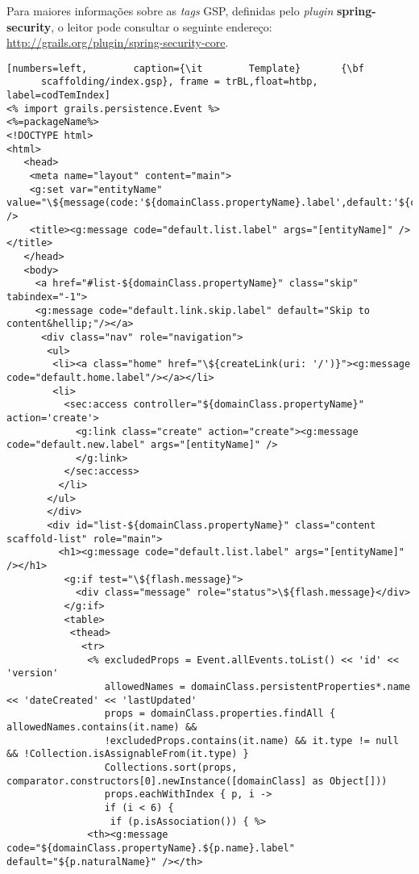 \vspace{0.3cm}

Para maiores  informações sobre as {\it  tags} GSP, definidas  pelo {\it plugin}
{\bf   spring-security},  o   leitor   pode  consultar   o  seguinte   endereço:
\url{http://grails.org/plugin/spring-security-core}. 

\begin{lstlisting}[numbers=left,        caption={\it        Template}       {\bf
      scaffolding/index.gsp}, frame = trBL,float=htbp, label=codTemIndex] 
<% import grails.persistence.Event %>
<%=packageName%>
<!DOCTYPE html>
<html>
   <head>
    <meta name="layout" content="main">
    <g:set var="entityName" value="\${message(code:'${domainClass.propertyName}.label',default:'${className}')}" />
    <title><g:message code="default.list.label" args="[entityName]" /></title>
   </head>
   <body>
     <a href="#list-${domainClass.propertyName}" class="skip" tabindex="-1">
     <g:message code="default.link.skip.label" default="Skip to content&hellip;"/></a>
      <div class="nav" role="navigation">
       <ul>
        <li><a class="home" href="\${createLink(uri: '/')}"><g:message code="default.home.label"/></a></li>
        <li>
          <sec:access controller="${domainClass.propertyName}" action='create'>
            <g:link class="create" action="create"><g:message code="default.new.label" args="[entityName]" />
            </g:link>
          </sec:access>
         </li> 
       </ul>
       </div>
       <div id="list-${domainClass.propertyName}" class="content scaffold-list" role="main">
         <h1><g:message code="default.list.label" args="[entityName]" /></h1>
          <g:if test="\${flash.message}">
            <div class="message" role="status">\${flash.message}</div>
          </g:if>
          <table>
           <thead>
             <tr>
              <% excludedProps = Event.allEvents.toList() << 'id' << 'version'
                 allowedNames = domainClass.persistentProperties*.name << 'dateCreated' << 'lastUpdated'
                 props = domainClass.properties.findAll { allowedNames.contains(it.name) && 
                 !excludedProps.contains(it.name) && it.type != null && !Collection.isAssignableFrom(it.type) }
                 Collections.sort(props, comparator.constructors[0].newInstance([domainClass] as Object[]))
                 props.eachWithIndex { p, i ->
                 if (i < 6) {
                  if (p.isAssociation()) { %>
              <th><g:message code="${domainClass.propertyName}.${p.name}.label" default="${p.naturalName}" /></th>

\end{lstlisting}
